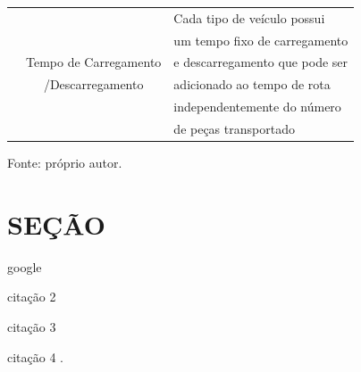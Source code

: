 \begin{quadro}[H]
\begin{tabular}{|c|c|l|}
                                            &                                               & Cada tipo de veículo possui  \\
                                            &                                               & um tempo fixo de carregamento         \\
                                            & Tempo de Carregamento                         & e descarregamento que pode ser        \\
                                            & /Descarregamento                              & adicionado ao tempo de rota           \\
                                            &                                               & independentemente do número           \\
                                            &                                               & de peças transportado                 \\ 
                \hline
            \end{tabular}
            \label{tab:restricoes}
            \par \footnotesize Fonte: próprio autor.
        \end{quadro}

\section{SEÇÃO}
    
    \noindent google \cite{Mansini2014}

    \noindent citação 2 \cite{Markowitz1952}

    \noindent citação 3 \cite{Vukovic2020}

    \noindent citação 4 .
